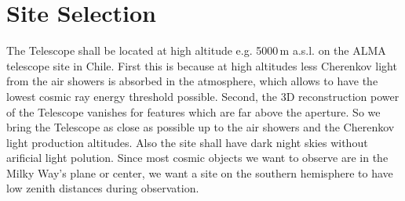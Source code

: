 \documentclass[11pt,a4paper,oneside,titlepage]{article}
\begin{document}
\newpage
\tableofcontents
\cleardoublepage
%
\setcounter{page}{0}
%
\linenumbers
\newcommand{\OutOfFocus}{\textit{out of focus}}
\newcommand{\InFocus}{\textit{in focus}}
\newcommand{\FocalRatio}{F}
\newcommand{\FocalLength}{f}
\newcommand{\ImageDistance}{b}
\newcommand{\ImageSensorDistance}{d}
\newcommand{\ObjectDistance}{g}
\newcommand{\ApertureDiameter}{D}
\newcommand{\ApertureFunction}{A}
\newcommand{\BokehFunction}{B}
\newcommand{\FieldOfView}{\alpha}
\newcommand{\BokehRadius}{r_\BokehFunction}
\newcommand{\BokehTemplateFunction}{\BokehFunction_{\text{template}}}
\newcommand{\ApertureRadius}{r_\ApertureFunction}
\newcommand{\zHy}{{z_\text{Hy}}}
\newcommand{\zPa}{{z_\text{Pa}}}
\newcommand{\zDC}{{z_\text{DC}}}
\section{Site Selection}
%
The Telescope shall be located at high altitude e.g. 5000\,m a.s.l. on the ALMA telescope site in Chile.
%
First this is because at high altitudes less Cherenkov light from the air showers is absorbed in the atmosphere, which allows to have the lowest cosmic ray energy threshold possible.
%
Second, the 3D reconstruction power of the Telescope vanishes for features which are far above the aperture.
%
So we bring the Telescope as close as possible up to the air showers and the Cherenkov light production altitudes.
%
Also the site shall have dark night skies without arificial light polution.
%
Since most cosmic objects we want to observe are in the Milky Way's plane or center, we want a site on the southern hemisphere to have low zenith distances during observation.
\end{document}

